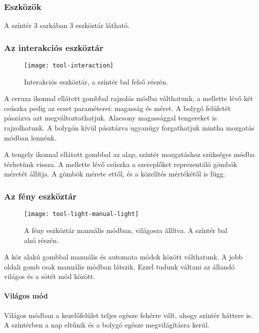 \subsubsection{Eszközök} \label{section:ui-utilities}

A színtér 3 sarkában 3 eszköztár látható.

\subsubsection{Az interakciós eszköztár}

\begin{figure}[h!]
	\centering
	\texttt{[image: tool-interaction]}
	\caption{Interakciós eszköztár, a színtér bal felső részén.}
	\label{fig:tool-interaction}
\end{figure}

A ceruza ikonnal ellátott gombbal rajzolás módba válthatunk, a mellette lévő két csúszka pedig az ecset paraméterei: magasság és méret. A bolygó felületét pászázva azt megváltoztathatjuk. Alacsony magassággal tengereket is rajzolhatunk. A bolygón kívül pásztázva ugyanúgy forgathatjuk mintha mozgatás módban lennénk.

A tengely ikonnal ellátott gombbal az alap, színtér mozgatáshoz szükséges módba térhetünk vissza. A mellette lévő csúszka a szereplőket reprezentáló gömbök méretét állítja. A gömbök mérete ettől, és a közelítés mértékétől is függ.


\subsubsection{Az fény eszköztár}

\begin{figure}[h!]
	\centering
	\texttt{[image: tool-light-manual-light]}
	\caption{A fény eszköztár manuális módban, világosra állítva. A színtér bal alsó részén.}
	\label{fig:tool-light-manual-light}
\end{figure}

A kör alakú gombbal manuális és automata módok között válthatunk. A jobb oldali gomb csak manuális módban látszik. Ezzel tudunk váltani az állandó világos és a sötét mód között.

\paragraph{Világos mód}

Világos módban a kezelőfelület teljes egésze fehérre vált, ahogy színtér háttere is. A színtérben a nap eltűnik és a bolygó egésze megvilágításra kerül.

